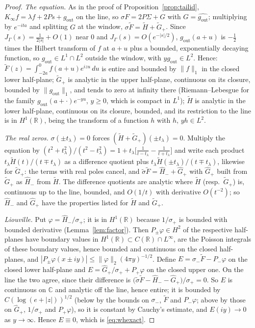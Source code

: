 \documentclass[11pt]{article}
\theoremstyle{definition}
\theoremstyle{remark}
\newcommand{\R}{\mathbb{R}}
\newcommand{\C}{\mathbb{C}}
\begin{document}
\begin{proof}
\emph{The equation.} As in the proof of Proposition~\ref{prop:tailid}, $K_\infty f=\lambda f+2Ps+g_{\mathrm{out}}$ on the line, so $\sigma F=2P\Sigma+G$ with $G=\widehat{g_{\mathrm{out}}}$; multiplying by $e^{-ita}$ and splitting $G$ at the window, $\sigma\tilde F=\tilde H+\tilde G_+$. Since $J_\Gamma(s)=\frac1{2|s|}+O(1)$ near $0$ and $J_\Gamma(s)=O(e^{-|s|/2})$, $g_{\mathrm{out}}(a+u)$ is $-\frac12$ times the Hilbert transform of $f$ at $a+u$ plus a bounded, exponentially decaying function, so $g_{\mathrm{out}}\in L^1\cap L^2$ outside the window, with $yg_{\mathrm{out}}\in L^2$. Hence: $\tilde F(z)=\int_{-2a}^0f(a+u)e^{izu}\,du$ is entire and bounded by $\|f\|_1$ in the closed lower half-plane; $\tilde G_+$ is analytic in the upper half-plane, continuous on its closure, bounded by $\|g_{\mathrm{out}}\|_1$, and tends to zero at infinity there (Riemann--Lebesgue for the family $g_{\mathrm{out}}(a+\cdot)e^{-yu}$, $y\ge0$, which is compact in $L^1$); $\tilde H$ is analytic in the lower half-plane, continuous on its closure, bounded, and its restriction to the line is in $H^1(\R)$, being the transform of a function $h$ with $h,\,yh\in L^2$.

\emph{The real zeros.} $\sigma(\pm t_\lambda)=0$ forces $(\tilde H+\tilde G_+)(\pm t_\lambda)=0$. Multiply the equation by $(t^2+t_\lambda^2)/(t^2-t_\lambda^2)=1+t_\lambda\big[\frac1{t-t_\lambda}-\frac1{t+t_\lambda}\big]$ and write each product $t_\lambda\tilde H(t)/(t\mp t_\lambda)$ as a difference quotient plus $t_\lambda\tilde H(\pm t_\lambda)/(t\mp t_\lambda)$, likewise for $\tilde G_+$: the terms with real poles cancel, and $\tilde\sigma\tilde F=\hat H_-+\hat G_+$ with $\hat G_+$ built from $\tilde G_+$ as $\hat H_-$ from $\tilde H$. The difference quotients are analytic where $\tilde H$ (resp.\ $\tilde G_+$) is, continuous up to the line, bounded, and $O(1/t)$ with derivative $O(t^{-2})$; so $\hat H_-$ and $\hat G_+$ have the properties listed for $\tilde H$ and $\tilde G_+$.

\emph{Liouville.} Put $\varphi=\hat H_-/\sigma_+$; it is in $H^1(\R)$ because $1/\sigma_+$ is bounded with bounded derivative (Lemma~\ref{lem:factor}). Then $P_\pm\varphi\in H^2$ of the respective half-planes have boundary values in $H^1(\R)\subset C(\R)\cap L^\infty$, are the Poisson integrals of these boundary values, hence bounded and continuous on the closed half-planes, and $|P_\pm\varphi(x\pm iy)|\le\|\varphi\|_2(4\pi y)^{-1/2}$. Define $E=\sigma_-\tilde F-P_-\varphi$ on the closed lower half-plane and $E=\hat G_+/\sigma_++P_+\varphi$ on the closed upper one. On the line the two agree, since their difference is $\big(\tilde\sigma\tilde F-\hat H_--\hat G_+\big)/\sigma_+=0$. So $E$ is continuous on $\C$ and analytic off the line, hence entire; it is bounded by $C(\log(e+|z|))^{1/2}$ (below by the bounds on $\sigma_-$, $\tilde F$ and $P_-\varphi$; above by those on $\hat G_+$, $1/\sigma_+$ and $P_+\varphi$), so it is constant by Cauchy's estimate, and $E(iy)\to0$ as $y\to\infty$. Hence $E\equiv0$, which is \eqref{eq:whexact}.
\end{proof}
\end{document}

